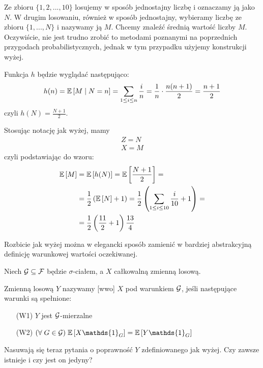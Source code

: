 \begin{example}
  \item Ze zbioru $\{1, 2,...,10\}$ losujemy w sposób jednostajny liczbę i oznaczamy ją jako $N$. W drugim losowaniu, również w sposób jednostajny, wybieramy liczbę ze zbioru $\{1,...,N\}$ i nazywamy ją $M$. Chcemy znaleźć średnią wartość liczby $M$. Oczywiście, nie jest trudno zrobić to metodami poznanymi na poprzednich przygodach probabilistycznych, jednak w tym przypadku użyjemy konstrukcji wyżej.

    Funkcja $h$ będzie wyglądać następująco:
    $$h(n)=\expected{M}{N=n}=\sum_{1\leq i\leq n}\frac{i}{n}=\frac{1}{n}\cdot\frac{n(n+1)}{2}=\frac{n+1}{2}$$
    czyli $h(N)=\frac{N+1}{2}$.

    Stosując notację jak wyżej, mamy
    $$\begin{matrix}Z=N\\X=M\end{matrix}$$
    czyli podstawiając do wzoru:
    \begin{align*}
      \expected{M}&=\expected{h(N)}=\expected{\frac{N+1}{2}}=\\
                  &=\frac{1}{2}\left(\expected{N}+1\right)=\frac{1}{2}\left(\sum_{1\leq i\leq 10}\frac{i}{10}+1\right)=\\
                  &=\frac{1}{2}\left(\frac{11}{2}+1\right)\frac{13}{4}
    \end{align*}
\end{example}

Rozbicie jak wyżej można w elegancki sposób zamienić w bardziej abstrakcyjną definicję warunkowej wartości oczekiwanej.

\begin{definition}\label{wwo-definicja}
  Niech $\mathcal{G}\subseteq \mathcal{F}$ będzie $\sigma$-ciałem, a $X$ całkowalną zmienną losową. 

  Zmienną losową $Y$ nazywamy  [wwo] $X$ pod warunkiem $\mathcal{G}$, jeśli następujące warunki są spełnione:
  \begin{itemize}[leftmargin=50pt]
    \item[(W1)] $Y$ jest $\mathcal{G}$-mierzalne
    \item[(W2)] $(\forall\;G\in\set{G})\;\expected{X\mathds{1}_G}=\expected{Y\mathds{1}_G}$
  \end{itemize}
\end{definition}

Nasuwają się teraz pytania o poprawność $Y$ zdefiniowanego jak wyżej. Czy zawsze istnieje i czy jest on jedyny?

